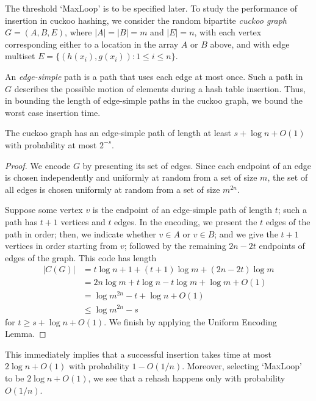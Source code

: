 \documentclass{patmorin}
\begin{document}
\begin{algorithmic}[1]
    \RETURN
  \ENDIF

      \RETURN
    \ENDIF
      \RETURN
    \ENDIF
  \ENDFOR
\end{algorithmic}

The threshold `MaxLoop' is to be specified later. To study the
performance of insertion in cuckoo hashing, we consider the random
bipartite \emph{cuckoo graph} $G = (A, B, E)$, where $|A| = |B| = m$
and $|E| = n$, with each vertex corresponding either to a location in
the array $A$ or $B$ above, and with edge multiset
$E = \{(h(x_i), g(x_i)) : 1 \leq i \leq n\}$.

An \emph{edge-simple} path is a path that uses each edge at most once. Such
a path in $G$ describes the possible motion of elements during a
hash table insertion. Thus, in bounding the length of edge-simple
paths in the cuckoo graph, we bound the worst case insertion time.

\begin{lem}
  The cuckoo graph has an edge-simple path of length at least
  $s + \log n + O(1)$ with probability at most $2^{-s}$.
\end{lem}
\begin{proof}
  We encode $G$ by presenting its set of edges. Since each endpoint of
  an edge is chosen independently and uniformly at random from a set
  of size $m$, the set of all edges is chosen uniformly at random from
  a set of size $m^{2n}$.

  Suppose some vertex $v$ is the endpoint of an edge-simple path
  of length $t$; such a path has $t + 1$ vertices and $t$ edges. In
  the encoding, we present the $t$ edges of the path in order; then,
  we indicate whether $v \in A$ or $v \in B$; and we give the $t + 1$
  vertices in order starting from $v$; followed by the remaining
  $2n - 2t$ endpoints of edges of the graph. This code has length
  \begin{align*}
    |C(G)| &= t \log n + 1 + (t + 1) \log m + (2n - 2t) \log m\\
           &= 2n \log m + t \log n - t \log m + \log m + O(1) \\
           &= \log m^{2n} - t + \log n + O(1) \tag{since $m = 2n$} \\
           &\leq \log m^{2n} - s
  \end{align*}
  for $t \geq s + \log n + O(1)$. We finish by applying the Uniform
  Encoding Lemma.
\end{proof}
This immediately implies that a successful insertion takes time at
most $2 \log n + O(1)$ with probability $1 - O(1/n)$. Moreover,
selecting `MaxLoop' to be $2\log n + O(1)$, we see that a rehash
happens only with probability $O(1/n)$.
\end{document}

